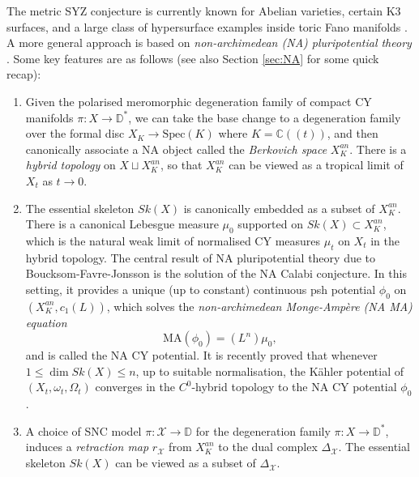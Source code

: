 \documentclass[a4paper]{article}
\theoremstyle{definition}
\newcommand{\C}{\mathbb{C}}
\begin{document}
	
	
	
	
	The metric SYZ conjecture is currently known for Abelian varieties, certain K3 surfaces, and  a large class of hypersurface examples inside toric Fano manifolds \cite{GrossWilson, LiFermat, LiFano, Hultgren, Hultgren2, PilleSchneider, GotoOdaka}. A more general approach is based on \emph{non-archimedean (NA) pluripotential theory} \cite{Boucksom,Boucksomsurvey, LiNA}. Some key features are as follows (see also Section \ref{sec:NA} for some quick recap):
	
	
	\begin{enumerate}
		\item    Given the polarised
		meromorphic degeneration family of compact CY manifolds $\pi: X\to \mathbb{D}^*$, we can take the base change to a degeneration family over the formal disc $X_K\to \text{Spec}(K)$ where $K=\C(\!(t)\!)$, and then canonically
		associate a NA object called the \emph{Berkovich space} $X_K^{an}$.  There is a \emph{hybrid topology} on $X\sqcup X_K^{an}$, so that $X_K^{an}$ can be viewed as a tropical limit of $X_t$ as $t\to 0$. 
		
		

		
		
		\item 	
		
		The essential skeleton $Sk(X)$ is canonically embedded as a subset of $X_K^{an}$.		There is a canonical Lebesgue measure $\mu_0$ supported on $Sk(X) \subset X_K^{an}$, which is the natural weak limit of normalised CY measures $\mu_t$
		on $X_t$ in the hybrid topology. The central result of NA pluripotential theory due to Boucksom-Favre-Jonsson \cite{Boucksom} is the solution of the NA Calabi conjecture. In this setting, it provides a unique (up to constant) continuous psh potential $\phi_0$ on $(X_K^{an}, c_1(L))$, which solves the \emph{non-archimedean Monge-Amp\`ere (NA MA) equation}
		\[
		\text{MA}( \phi_0) = (L^n)\mu_0,
		\]
		and is called the NA CY potential. 
		It is recently proved \cite{Litheta} that whenever $1\leq \dim Sk(X)\leq n$,  up to suitable normalisation, the K\"ahler potential of $(X_t, \omega_t, \Omega_t)$ converges in the $C^0$-hybrid topology  to the NA CY potential $\phi_0$.
		
		
		
		\item  A choice of SNC model $\pi: \mathcal{X}\to \mathbb{D}$ for the degeneration family $\pi: X\to \mathbb{D}^*$, induces a \emph{retraction map} $r_\mathcal{X}$ from $X_K^{an}$ to the dual complex $\Delta_{\mathcal{X}}$. The essential skeleton $Sk(X)$ can be viewed as a subset of $\Delta_{\mathcal{X}}$. 
		

\end{enumerate}
\end{document}
